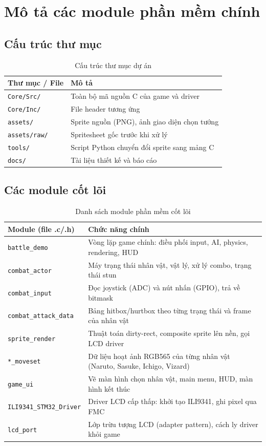 \documentclass[a4paper,12pt]{report}
\begin{document}
\section{Mô tả các module phần mềm chính}

\subsection{Cấu trúc thư mục}

\begin{table}[H]
\centering
\caption{Cấu trúc thư mục dự án}
\begin{tabular}{p{4.5cm} p{9cm}}
\toprule
\textbf{Thư mục / File} & \textbf{Mô tả} \\
\midrule
\texttt{Core/Src/} & Toàn bộ mã nguồn C của game và driver \\
\texttt{Core/Inc/} & File header tương ứng \\
\texttt{assets/} & Sprite nguồn (PNG), ảnh giao diện chọn tướng \\
\texttt{assets/raw/} & Spritesheet gốc trước khi xử lý \\
\texttt{tools/} & Script Python chuyển đổi sprite sang mảng C \\
\texttt{docs/} & Tài liệu thiết kế và báo cáo \\
\bottomrule
\end{tabular}
\end{table}

\subsection{Các module cốt lõi}

\begin{table}[H]
\centering
\caption{Danh sách module phần mềm cốt lõi}
\begin{tabular}{p{4.5cm} p{9cm}}
\toprule
\textbf{Module (file .c/.h)} & \textbf{Chức năng chính} \\
\midrule
\texttt{battle\_demo} & Vòng lặp game chính: điều phối input, AI, physics, rendering, HUD \\
\texttt{combat\_actor} & Máy trạng thái nhân vật, vật lý, xử lý combo, trạng thái stun \\
\texttt{combat\_input} & Đọc joystick (ADC) và nút nhấn (GPIO), trả về bitmask \\
\texttt{combat\_attack\_data} & Bảng hitbox/hurtbox theo từng trạng thái và frame của nhân vật \\
\texttt{sprite\_render} & Thuật toán dirty-rect, composite sprite lên nền, gọi LCD driver \\
\texttt{*\_moveset} & Dữ liệu hoạt ảnh RGB565 của từng nhân vật (Naruto, Sasuke, Ichigo, Vizard) \\
\texttt{game\_ui} & Vẽ màn hình chọn nhân vật, main menu, HUD, màn hình kết thúc \\
\texttt{ILI9341\_STM32\_Driver} & Driver LCD cấp thấp: khởi tạo ILI9341, ghi pixel qua FMC \\
\texttt{lcd\_port} & Lớp trừu tượng LCD (adapter pattern), cách ly driver khỏi game \\
\bottomrule
\end{tabular}
\end{table}
\end{document}
